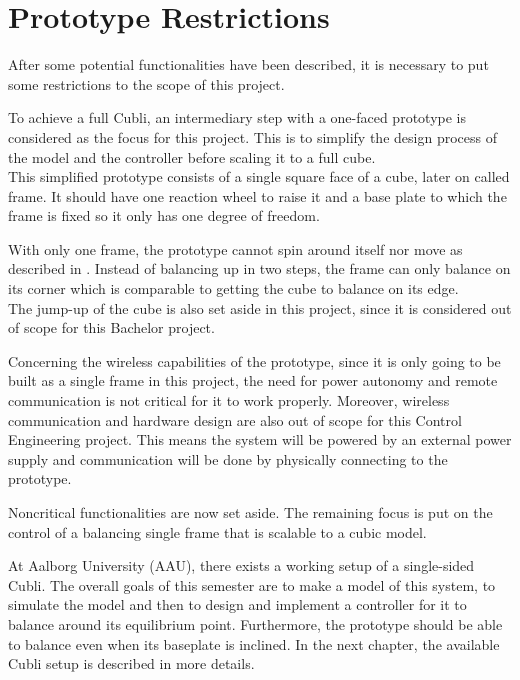 \section{Prototype Restrictions}\label{sec:protoRestrictions}
After some potential functionalities have been described, it is necessary to put some restrictions to the scope of this project.

To achieve a full Cubli, an intermediary step with a one-faced prototype is considered as the focus for this project. This is to simplify the design process of the model and the controller before scaling it to a full cube.\\
This simplified prototype consists of a single square face of a cube, later on called frame. It should have one reaction wheel to raise it and a base plate to which the frame is fixed so it only has one degree of freedom.

With only one frame, the prototype cannot spin around itself nor move as described in . Instead of balancing up in two steps, the frame can only balance on its corner which is comparable to getting the cube to balance on its edge.\\
The jump-up of the cube is also set aside in this project, since it is considered out of scope for this Bachelor project.

Concerning the wireless capabilities of the prototype, since it is only going to be built as a single frame in this project, the need for power autonomy and remote communication is not critical for it to work properly. Moreover, wireless communication and hardware design are also out of scope for this Control Engineering project. This means the system will be powered by an external power supply and communication will be done by physically connecting to the prototype.

Noncritical functionalities are now set aside. The remaining focus is put on the control of a balancing single frame that is scalable to a cubic model.

At Aalborg University (AAU), there exists a working setup of a single-sided Cubli. The overall goals of this semester are to make a model of this system, to simulate the model and then to design and implement a controller for it to balance around its equilibrium point. Furthermore, the prototype should be able to balance even when its baseplate is inclined.
In the next chapter, the available Cubli setup is described in more details.



